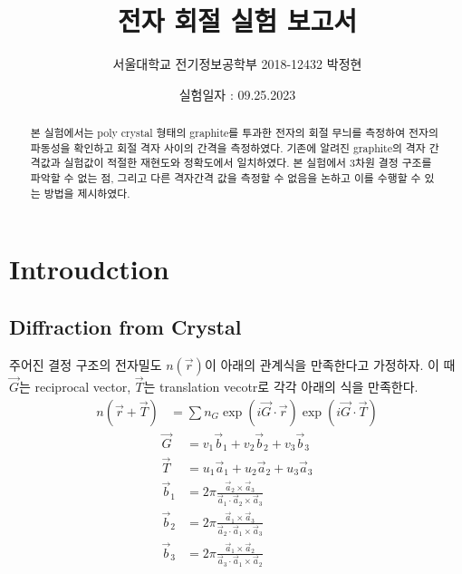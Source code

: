 \documentclass[%
 reprint,
 amsmath,amssymb,
 aps,
]{revtex4-2}
\begin{document}
\title{전자 회절 실험 보고서}

\author{서울대학교 전기정보공학부 2018-12432 박정현}
\date{실험일자 : 09.25.2023}%

\begin{abstract}
본 실험에서는 poly crystal 형태의 graphite를 투과한 전자의 회절 무늬를 측정하여 전자의 파동성을 확인하고 회절 격자 사이의 간격을 측정하였다. 기존에 알려진 graphite의 격자 간격값과 실험값이 적절한 재현도와 정확도에서 일치하였다. 본 실험에서 3차원 결정 구조를 파악할 수 없는 점, 그리고 다른 격자간격 값을 측정할 수 없음을 논하고 이를 수행할 수 있는 방법을 제시하였다.
\end{abstract}

\maketitle


\section{\label{sec:level1}Introudction}
\subsection{\label{sec:level2}Diffraction from Crystal}
주어진 결정 구조의 전자밀도 $n(\vec{r})$이 아래의 관계식을 만족한다고 가정하자. 이 때 $\vec{G}$는 reciprocal vector, $\vec{T}$는 translation vecotr로 각각 아래의 식을 만족한다.
\begin{align}
	n(\vec{r}+\vec{T}) &= \sum n_{G}\exp(i\vec{G}\cdot \vec{r})\exp(i\vec{G}\cdot\vec{T})
\end{align}
\begin{align}
	\vec{G} &= v_{1}\vec{b}_{1} + v_{2}\vec{b}_{2} + v_{3}\vec{b}_{3}\\
	\vec{T} &=  u_{1}\vec{a}_{1} + u_{2}\vec{a}_{2} + u_{3}\vec{a}_{3}\\
	\vec{b}_{1} &= 2\pi\frac{\vec{a}_{2}\times\vec{a}_{3}}{\vec{a}_{1}\cdot\vec{a}_{2}\times\vec{a}_{3}}\\
	\vec{b}_{2} &= 2\pi\frac{\vec{a}_{1}\times\vec{a}_{3}}{\vec{a}_{2}\cdot\vec{a}_{1}\times\vec{a}_{3}}\\
	\vec{b}_{3} &= 2\pi\frac{\vec{a}_{1}\times\vec{a}_{2}}{\vec{a}_{3}\cdot\vec{a}_{1}\times\vec{a}_{2}}
\end{align}
\end{document}
